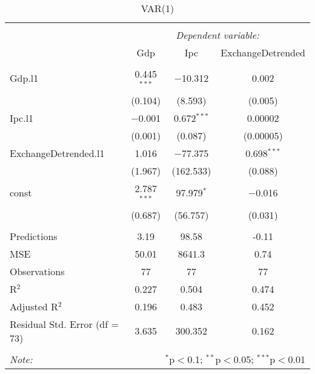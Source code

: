 
\begin{table}[H] \centering 
  \caption{VAR(1)} 
  \label{tb:var_1} 
\begin{tabular}{@{\extracolsep{5pt}}lccc} 
\\[-1.8ex]\hline 
\hline \\[-1.8ex] 
 & \multicolumn{3}{c}{\textit{Dependent variable:}} \\ 
\cline{2-4} 
 & Gdp & Ipc & ExchangeDetrended \\ 
\hline \\[-1.8ex] 
 Gdp.l1 & 0.445$^{***}$ & $-$10.312 & 0.002 \\ 
  & (0.104) & (8.593) & (0.005) \\ 
  Ipc.l1 & $-$0.001 & 0.672$^{***}$ & 0.00002 \\ 
  & (0.001) & (0.087) & (0.00005) \\ 
  ExchangeDetrended.l1 & 1.016 & $-$77.375 & 0.698$^{***}$ \\ 
  & (1.967) & (162.533) & (0.088) \\ 
  const & 2.787$^{***}$ & 97.979$^{*}$ & $-$0.016 \\ 
  & (0.687) & (56.757) & (0.031) \\ 
 \hline \\[-1.8ex] 
Predictions & 3.19 & 98.58 & -0.11 \\ 
MSE & 50.01 & 8641.3 & 0.74 \\ 
Observations & 77 & 77 & 77 \\ 
R$^{2}$ & 0.227 & 0.504 & 0.474 \\ 
Adjusted R$^{2}$ & 0.196 & 0.483 & 0.452 \\ 
Residual Std. Error (df = 73) & 3.635 & 300.352 & 0.162 \\ 
\hline 
\hline \\[-1.8ex] 
\textit{Note:}  & \multicolumn{3}{r}{$^{*}$p$<$0.1; $^{**}$p$<$0.05; $^{***}$p$<$0.01} \\ 
\end{tabular} 
\end{table} 
